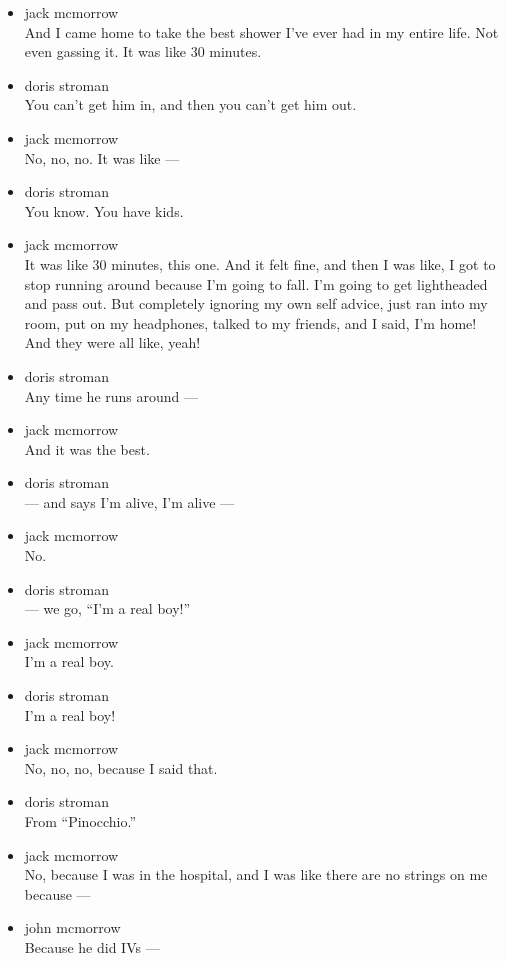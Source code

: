 \begin{itemize}
\item
  jack mcmorrow\\
  And I came home to take the best shower I've ever had in my entire
  life. Not even gassing it. It was like 30 minutes.
\item
  doris stroman\\
  You can't get him in, and then you can't get him out.
\item
  jack mcmorrow\\
  No, no, no. It was like ---
\item
  doris stroman\\
  You know. You have kids.
\item
  jack mcmorrow\\
  It was like 30 minutes, this one. And it felt fine, and then I was
  like, I got to stop running around because I'm going to fall. I'm
  going to get lightheaded and pass out. But completely ignoring my own
  self advice, just ran into my room, put on my headphones, talked to my
  friends, and I said, I'm home! And they were all like, yeah!
\item
  doris stroman\\
  Any time he runs around ---
\item
  jack mcmorrow\\
  And it was the best.
\item
  doris stroman\\
  --- and says I'm alive, I'm alive ---
\item
  jack mcmorrow\\
  No.
\item
  doris stroman\\
  --- we go, ``I'm a real boy!''
\item
  jack mcmorrow\\
  I'm a real boy.
\item
  doris stroman\\
  I'm a real boy!
\item
  jack mcmorrow\\
  No, no, no, because I said that.
\item
  doris stroman\\
  From ``Pinocchio.''
\item
  jack mcmorrow\\
  No, because I was in the hospital, and I was like there are no strings
  on me because ---
\item
  john mcmorrow\\
  Because he did IVs ---
\end{itemize}

